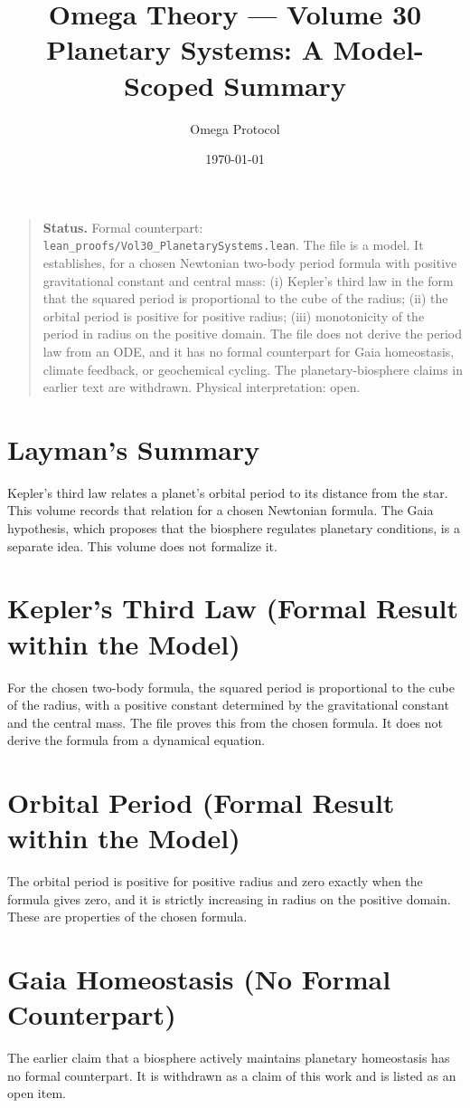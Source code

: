 \documentclass[11pt, a4paper]{article}
\title{Omega Theory --- Volume 30\\\Large Planetary Systems: A Model-Scoped Summary}
\author{Omega Protocol}
\date{\today}
\begin{document}
\maketitle

\begin{quote}
\textbf{Status.} Formal counterpart: \texttt{lean\_proofs/Vol30\_PlanetarySystems.lean}. The file is a model. It establishes, for a chosen Newtonian two-body period formula with positive gravitational constant and central mass: (i) Kepler's third law in the form that the squared period is proportional to the cube of the radius; (ii) the orbital period is positive for positive radius; (iii) monotonicity of the period in radius on the positive domain. The file does not derive the period law from an ODE, and it has no formal counterpart for Gaia homeostasis, climate feedback, or geochemical cycling. The planetary-biosphere claims in earlier text are withdrawn. Physical interpretation: open.
\end{quote}

\section*{Layman's Summary}
Kepler's third law relates a planet's orbital period to its distance from the star. This volume records that relation for a chosen Newtonian formula. The Gaia hypothesis, which proposes that the biosphere regulates planetary conditions, is a separate idea. This volume does not formalize it.

\section{Kepler's Third Law (Formal Result within the Model)}
For the chosen two-body formula, the squared period is proportional to the cube of the radius, with a positive constant determined by the gravitational constant and the central mass. The file proves this from the chosen formula. It does not derive the formula from a dynamical equation.

\section{Orbital Period (Formal Result within the Model)}
The orbital period is positive for positive radius and zero exactly when the formula gives zero, and it is strictly increasing in radius on the positive domain. These are properties of the chosen formula.

\section{Gaia Homeostasis (No Formal Counterpart)}
The earlier claim that a biosphere actively maintains planetary homeostasis has no formal counterpart. It is withdrawn as a claim of this work and is listed as an open item.
\end{document}
